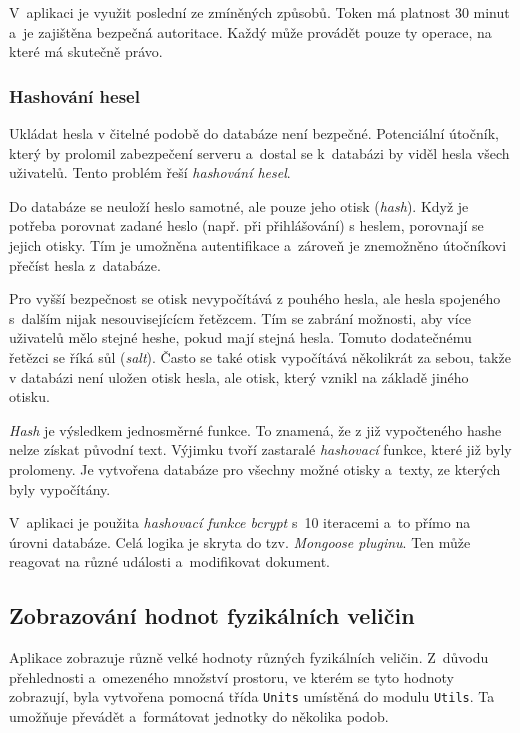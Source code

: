 \documentclass[a4paper,12pt]{article}
\def\code#1{\texttt{#1}}
\begin{document}
V~aplikaci je využit poslední ze zmíněných způsobů. Token má platnost 30 minut a~je zajištěna bezpečná autoritace. Každý může provádět pouze ty operace, na které má skutečně právo.

\subsubsection{Hashování hesel}

Ukládat hesla v čitelné podobě do databáze není bezpečné. Potenciální útočník, který by prolomil zabezpečení serveru a~dostal se k~databázi by viděl hesla všech uživatelů. Tento problém řeší \textit{hashování hesel}.

Do databáze se neuloží heslo samotné, ale pouze jeho otisk (\textit{hash}). Když je potřeba porovnat zadané heslo (např. při přihlášování) s heslem, porovnají se jejich otisky. Tím je umožněna autentifikace a~zároveň je znemožněno útočníkovi přečíst hesla z~databáze.

Pro vyšší bezpečnost se otisk nevypočítává z pouhého hesla, ale hesla spojeného s~dalším nijak nesouvisejícícm řetězcem. Tím se zabrání možnosti, aby více uživatelů mělo stejné heshe, pokud mají stejná hesla. Tomuto dodatečnému řetězci se říká sůl (\textit{salt}). Často se také otisk vypočítává několikrát za sebou, takže v databázi není uložen otisk hesla, ale otisk, který vznikl na základě jiného otisku.

\textit{Hash} je výsledkem jednosměrné funkce. To znamená, že z již vypočteného hashe nelze získat původní text. Výjimku tvoří zastaralé \textit{hashovací} funkce, které již byly prolomeny. Je vytvořena databáze pro všechny možné otisky a~texty, ze kterých byly vypočítány.

V~aplikaci je použita \textit{hashovací funkce bcrypt} s~10 iteracemi a~to přímo na úrovni databáze. Celá logika je skryta do tzv. \textit{Mongoose pluginu}. Ten může reagovat na různé události a~modifikovat dokument.



\vspace*{-0.5cm}
\subsection{Zobrazování hodnot fyzikálních veličin}

Aplikace zobrazuje různě velké hodnoty různých fyzikálních veličin. Z~důvodu přehlednosti a~omezeného množství prostoru, ve kterém se tyto hodnoty zobrazují, byla vytvořena pomocná třída \code{Units} umístěná do modulu \code{Utils}. Ta umožňuje převádět a~formátovat jednotky do několika podob.
\end{document}
